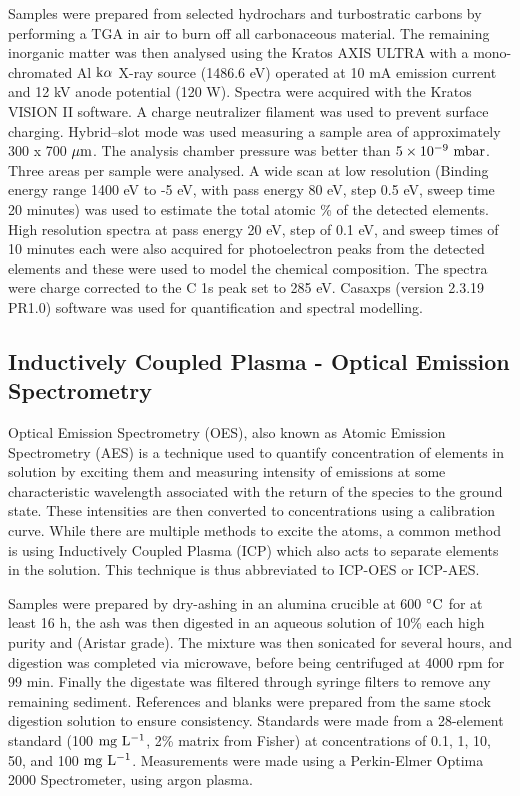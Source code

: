 Samples were prepared from selected hydrochars and turbostratic carbons by performing a TGA in air to burn off all carbonaceous material. The remaining inorganic matter was then analysed using the Kratos AXIS ULTRA with a mono-chromated Al $\rm k\alpha$ X-ray source (1486.6 eV) operated at 10 mA emission current and 12 kV anode potential (120 W). Spectra were acquired with the Kratos VISION II software. A charge neutralizer filament was used to prevent surface charging. Hybrid–slot mode was used measuring a
sample area of approximately 300 x 700 $\rm \mu m$. The analysis chamber pressure was better than $\rm \num{5e-9}\ mbar$. Three areas per sample were analysed. A wide scan at low resolution (Binding energy range 1400 eV to -5 eV, with pass energy 80 eV, step 0.5 eV, sweep time 20 minutes) was used to estimate the total atomic \% of the detected elements. High resolution spectra at pass energy 20 eV, step of 0.1 eV, and sweep times of 10 minutes each were also acquired for photoelectron peaks from the detected elements and these were used to model the chemical composition. The spectra were charge corrected to the C 1s peak set to 285 eV. Casaxps (version 2.3.19 PR1.0) software was used for quantification and spectral modelling.

\subsection{Inductively Coupled Plasma - Optical Emission Spectrometry}

Optical Emission Spectrometry (OES), also known as Atomic Emission Spectrometry (AES) is a technique used to quantify concentration of elements in solution by exciting them and measuring intensity of emissions at some characteristic wavelength associated with the return of the species to the ground state. These intensities are then converted to concentrations using a calibration curve. While there are multiple methods to excite the atoms, a common method is using Inductively Coupled Plasma (ICP) which also acts to separate elements in the solution. This technique is thus abbreviated to ICP-OES or ICP-AES.\citep{Hinners1988interlaboratory}

Samples were prepared by dry-ashing in an alumina crucible at 600 $\rm ^{\circ}C$ for at least 16 h, the ash was then digested in an aqueous solution of 10\% each high purity  and  (Aristar grade). The mixture was then sonicated for several hours, and digestion was completed via microwave, before being centrifuged at 4000 rpm for 99 min. Finally the digestate was filtered through syringe filters to remove any remaining sediment. References and blanks were prepared from the same stock digestion solution to ensure consistency. Standards were made from a 28-element standard (100 $\rm mg\ L^{-1}$, 2\%  matrix from Fisher) at concentrations of 0.1, 1, 10, 50, and 100 $\rm mg\ L^{-1}$. Measurements were made using a Perkin-Elmer Optima 2000 Spectrometer, using argon plasma.


